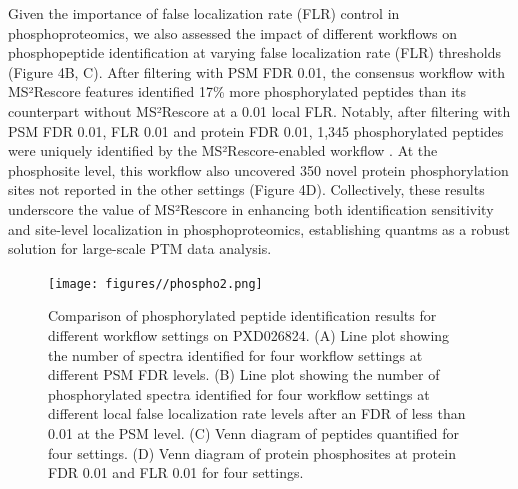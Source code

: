 \documentclass[12pt]{article}
\begin{document}
Given the importance of false localization rate (FLR) control in phosphoproteomics, we also assessed the impact of different workflows on phosphopeptide identification at varying false localization rate (FLR) thresholds (Figure 4B, C). After filtering with PSM FDR 0.01, the consensus workflow with MS²Rescore features identified 17\% more phosphorylated peptides than its counterpart without MS²Rescore at a 0.01 local FLR. Notably, after filtering with PSM FDR 0.01, FLR 0.01 and protein FDR 0.01, 1,345 phosphorylated peptides were uniquely identified by the MS²Rescore-enabled workflow . At the phosphosite level, this workflow also uncovered 350 novel protein phosphorylation sites not reported in the other settings (Figure 4D). Collectively, these results underscore the value of MS²Rescore in enhancing both identification sensitivity and site-level localization in phosphoproteomics, establishing quantms as a robust solution for large-scale PTM data analysis. %


\begin{figure}[ht!]
	\centering
	\texttt{[image: figures//phospho2.png]}
	\caption{Comparison of phosphorylated peptide identification results for different workflow settings on PXD026824. (A) Line plot showing the number of spectra identified for four workflow settings at different PSM FDR levels. (B) Line plot showing the number of phosphorylated spectra identified for four workflow settings at different local false localization rate levels after an FDR of less than 0.01 at the PSM level. (C) Venn diagram of peptides quantified for four settings. (D) Venn diagram of protein phosphosites at protein FDR 0.01 and FLR 0.01 for four settings.} %
	\label{fig:PXD026824_ms2rescore}
\end{figure}
\end{document}
